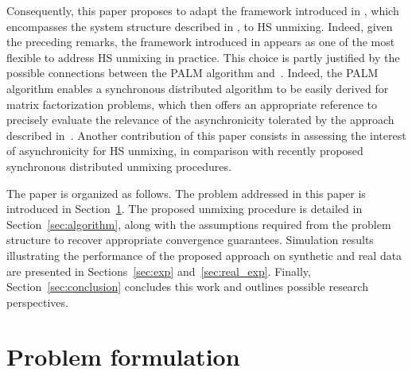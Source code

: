 \documentclass[journal,final,letterpaper,twoside,twocolumn]{IEEEtran}
\newcommand{\rev}[1]{\textcolor{red}{#1}}
\begin{document}
Consequently, this paper proposes to adapt the framework introduced in \cite{Cannelli2016}, which encompasses the system structure described in \cite{Chang2016}, to HS unmixing. Indeed, given the preceding remarks, the framework introduced in \cite{Cannelli2016} appears as one of the most flexible to address HS unmixing in practice. This choice is partly justified by the possible connections between the PALM algorithm and~\cite{Cannelli2016}. Indeed, the PALM algorithm enables a synchronous distributed algorithm to be easily derived for matrix factorization problems, which then offers an appropriate reference to precisely evaluate the relevance of the asynchronicity tolerated by the approach described in~\cite{Cannelli2016}. Another contribution of this paper consists in assessing the interest of asynchronicity for HS unmixing, in comparison with recently proposed synchronous distributed unmixing procedures.

The paper is organized as follows. The problem addressed in this paper is introduced in Section~\ref{sec:LMM}. The proposed unmixing procedure is detailed in Section~\ref{sec:algorithm}, along with the assumptions required from the problem structure to recover appropriate convergence guarantees. Simulation results illustrating the performance of the proposed approach on synthetic and real data are presented in Sections~\ref{sec:exp} and~\ref{sec:real_exp}. Finally, Section~\ref{sec:conclusion} concludes this work and outlines possible research perspectives.





\section{Problem formulation} \label{sec:LMM}
\end{document}
